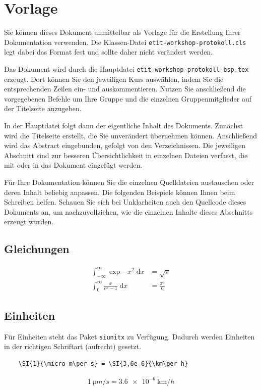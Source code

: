 \section{Vorlage}
Sie können dieses Dokument unmittelbar als Vorlage für die Erstellung Ihrer Dokumentation verwenden. Die Klassen-Datei \verb|etit-workshop-protokoll.cls| legt dabei das Format fest und sollte daher nicht verändert werden.

Das Dokument wird durch die Hauptdatei \verb|etit-workshop-protokoll-bsp.tex| erzeugt. Dort können Sie den jeweiligen Kurs auswählen, indem Sie die entsprechenden Zeilen ein- und auskommentieren. Nutzen Sie anschließend die vorgegebenen Befehle um Ihre Gruppe und die einzelnen Gruppenmitglieder auf der Titelseite anzugeben.

In der Hauptdatei folgt dann der eigentliche Inhalt des Dokuments. Zunächst wird die Titelseite erstellt, die Sie unverändert übernehmen können. Anschließend wird das Abstract eingebunden, gefolgt von den Verzeichnissen. Die jeweiligen Abschnitt sind zur besseren Übersichtlichkeit in einzelnen Dateien verfasst, die mit \verb|| oder \verb|| in das Dokument eingefügt werden. 

Für Ihre Dokumentation können Sie die einzelnen Quelldateien austauschen oder deren Inhalt beliebig anpassen. Die folgenden Beispiele können Ihnen beim Schreiben helfen. Schauen Sie sich bei Unklarheiten auch den Quellcode dieses Dokuments an, um nachzuvollziehen, wie die einzelnen Inhalte dieses Abschnitts erzeugt wurden.

\subsection{Gleichungen}
\begin{align}
    \int_{-\infty}^{\infty}\exp{-x^2}\;\mathrm{d}x &= \sqrt{\pi}\\
    \int_0^{\infty}\frac{x}{e^x-1}\;\mathrm{d}x&=\frac{\pi^2}{6}
\end{align}


\subsection{Einheiten}
Für Einheiten steht das Paket \verb|siunitx| zu Verfügung. Dadurch werden Einheiten in der richtigen Schriftart (aufrecht) gesetzt.
\begin{verbatim}
    \SI{1}{\micro m\per s} = \SI{3,6e-6}{\km\per h}
\end{verbatim}
\begin{align}
    \SI{1}{\micro m\per s} = \SI{3,6e-6}{\km\per h}
\end{align}


